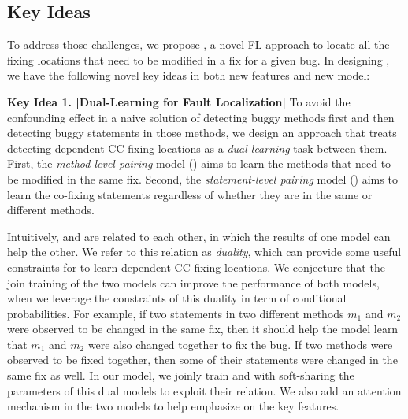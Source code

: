 \subsection{Key Ideas}
\label{sec:key-ideas}

To address those challenges, we propose {\tool}, a novel FL approach
to locate all the fixing locations that need to be modified in a fix
for a given bug. In designing {\tool}, we have the following novel key
ideas in both new features and new model:

{\bf Key Idea 1. [Dual-Learning for Fault Localization]} To avoid the
confounding effect in a naive solution of detecting buggy methods
first and then detecting buggy statements in those methods, we design
an approach that treats detecting dependent CC fixing locations as a
{\em dual learning} task between them. First, the {\em method-level
  pairing} model () aims to learn the methods that need
to be modified in the same fix. Second, the {\em statement-level
  pairing} model () aims to learn the co-fixing
statements regardless of whether they are in the same or different
methods.

Intuitively,  and  are related to each
other, in which the results of one model can help the other. We refer
to this relation as {\em duality}, which can provide some useful
constraints for {\tool} to learn dependent CC fixing locations.
%
We conjecture that the join training of the two models can improve the
performance of both models, when we leverage the constraints of this
duality in term of conditional probabilities. For example, if two
statements in two different methods $m_1$ and $m_2$ were observed to
be changed in the same fix, then it should help the model learn that
$m_1$ and $m_2$ were also changed together to fix the bug.  If two
methods were observed to be fixed together, then some of their
statements were changed in the same fix as well. In our model, we
joinly train  and  with soft-sharing the
parameters of this dual models to exploit their relation. We also add
an attention mechanism in the two models to help emphasize on the key
features.



